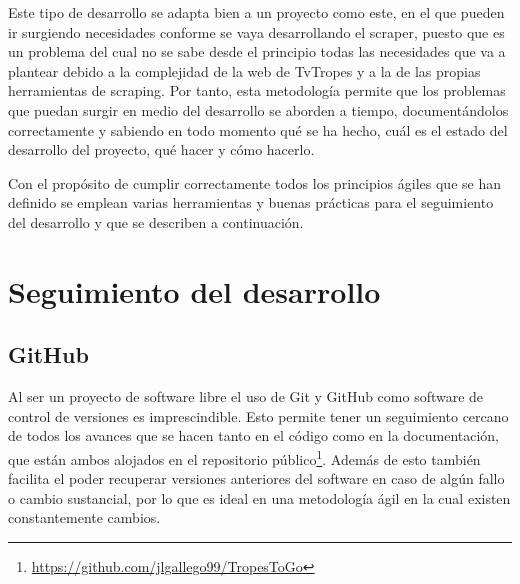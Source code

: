Este tipo de desarrollo se adapta bien a un proyecto como este, en el que pueden ir surgiendo necesidades conforme se vaya desarrollando el scraper, puesto que es un problema del cual no se sabe desde el principio todas las necesidades que va a plantear debido a la complejidad de la web de TvTropes y a la de las propias herramientas de scraping. Por tanto, esta metodología permite que los problemas que puedan surgir en medio del desarrollo se aborden a tiempo, documentándolos correctamente y sabiendo en todo momento qué se ha hecho, cuál es el estado del desarrollo del proyecto, qué hacer y cómo hacerlo.

Con el propósito de cumplir correctamente todos los principios ágiles que se han definido se emplean varias herramientas y buenas prácticas para el seguimiento del desarrollo y que se describen a continuación.

\section{Seguimiento del desarrollo}
\subsection{GitHub}
Al ser un proyecto de software libre el uso de Git y GitHub como software de control de versiones es imprescindible. Esto permite tener un seguimiento cercano de todos los avances que se hacen tanto en el código como en la documentación, que están ambos alojados en el repositorio público\footnote{\url{https://github.com/jlgallego99/TropesToGo}}. Además de esto también facilita el poder recuperar versiones anteriores del software en caso de algún fallo o cambio sustancial, por lo que es ideal en una metodología ágil en la cual existen constantemente cambios.

